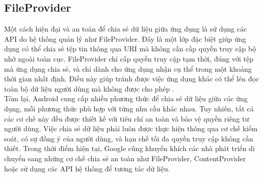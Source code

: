 \subsection{FileProvider}
\renewcommand{\labelitemi}{--}    
        \hspace*{0.8cm}Một cách hiện đại và an toàn để chia sẻ dữ liệu giữa ứng dụng là sử dụng các API do hệ thống quản lý như FileProvider. Đây là một lớp đặc biệt giúp ứng dụng có thể chia sẻ tệp tin thông qua URI mà không cần cấp quyền truy cập bộ nhớ ngoài toàn cục. FileProvider chỉ cấp quyền truy cập tạm thời, đúng với tệp mà ứng dụng chia sẻ, và chỉ dành cho ứng dụng nhận cụ thể trong một khoảng thời gian nhất định. Điều này giúp tránh được việc ứng dụng khác có thể lén đọc toàn bộ dữ liệu người dùng mà không được cho phép \cite{FileProvider}.\\
      \hspace*{0.8cm}Tóm lại, Android cung cấp nhiều phương thức để chia sẻ dữ liệu giữa các ứng dụng, mỗi phương thức phù hợp với từng nhu cầu khác nhau. Tuy nhiên, tất cả các cơ chế này đều được thiết kế với tiêu chí an toàn và bảo vệ quyền riêng tư người dùng. Việc chia sẻ dữ liệu phải luôn được thực hiện thông qua cơ chế kiểm soát, có sự đồng ý của người dùng, và hạn chế tối đa quyền truy cập không cần thiết. Trong thời điểm hiện tại, Google cũng khuyến khích các nhà phát triển di chuyển sang những cơ chế chia sẻ an toàn như FileProvider, ContentProvider hoặc sử dụng các API hệ thống để tương tác dữ liệu.

